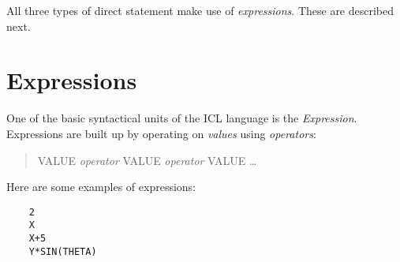 All three types of direct statement make use of {\em expressions}.
These are described next.

\section{Expressions}
\label{S_expr}

One of the basic syntactical units of the ICL language is the {\em Expression}.
Expressions are built up by operating on {\em values} using {\em operators}:
\begin{quote}
VALUE {\em operator} VALUE {\em operator} VALUE \ldots
\end{quote}
Here are some examples of expressions:

\begin{small}
\begin{verbatim}
    2
    X
    X+5
    Y*SIN(THETA)
\end{verbatim}
\end{small}

